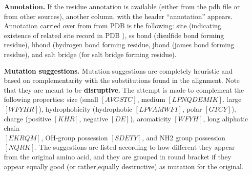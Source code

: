 {\bf Annotation.} If the residue annotation is available (either from the pdb file or from other sources), another column,
with the header ``annotation'' appears. Annotation carried over from from PDB is the following: 
site (indicating existence of related  site record in PDB ), ss bond (disulfide bond forming residue),  
hbond (hydrogen bond forming residue, jbond (james bond forming residue), and salt bridge (for salt bridge
forming residue).

{\bf Mutation suggestions.} Mutation suggestions are completely heuristic and based on complementarity with the substitutions found
in the alignment. Note that they are meant to be {\bf disruptive}.
The attempt is made to complement the following properties: size (small $[AVGSTC]$, medium $[
LPNQDEMIK]$, large $[WFYHR]$), 
hydrophobicity (hydrophobic $[LPVAMWFI]$, polar $[GTCY]$), charge (positive $[KHR]$,
 negative $[DE]$), aromaticity $[WFYH]$, long aliphatic chain \\$[EKRQM]$, 
 OH-group possession $[SDETY]$, and NH2 group possession $[NQRK]$.
The suggestions are listed according to how different they appear from the original amino acid, 
and they are grouped in round bracket   
if they appear equally good (or rather,equally  destructive) as mutation for the original.

